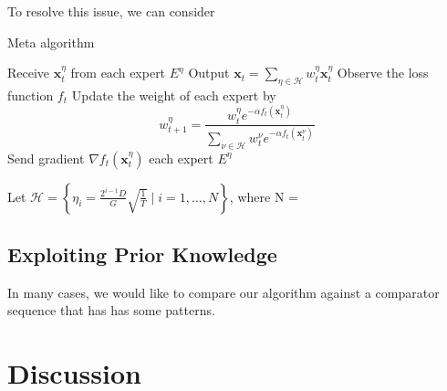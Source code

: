 \documentclass[12pt, a4paper]{report}
\begin{document}

To resolve this issue, we can consider 
\begin{algorithm}
\caption{Meta algorithm}\label{ader:meta}
\begin{algorithmic}[1]
\State Receive $\mathbf{x}_t^{\eta}$ from each expert $E^{\eta}$
\State Output $\displaystyle \mathbf{x}_t = \sum_{\eta \in \mathcal{H}} w_{t}^{\eta} \mathbf{x}_t^{\eta}$
\State Observe the loss function $f_t$
\State Update the weight of each expert by \[
    w_{t+1}^{\eta} = \frac{w_t^{\eta}e^{-\alpha f_t(\mathbf{x}_t^{\eta})}}{\sum_{\nu \in \mathcal{H}}w_t^{\nu}e^{-\alpha f_t(\mathbf{x}_t^{\nu})}}
\]
\State Send gradient $\nabla f_t(\mathbf{x}_t^{\eta})$ each expert $E^{\eta}$ 
\EndFor
\end{algorithmic}
\end{algorithm}
\begin{thm}
Let $\mathcal{H} = \left\{ \eta_i = \frac{2^{i-1}D}{G}\sqrt{\frac{1}{T}} \mid i = 1, \dots, N \right\}$, where N = 
\end{thm}
\section{Exploiting Prior Knowledge}
In many cases, we would like to compare our algorithm against a comparator sequence that has has some patterns.



\chapter{Discussion}
\label{Chap4}

\renewcommand{\bibname}{Bibliography}



\end{document}
